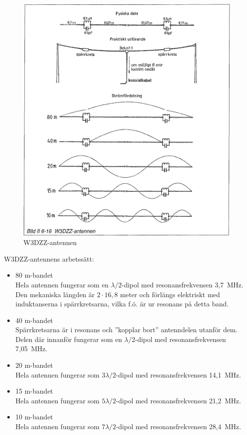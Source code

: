 \begin{figure}
  \includegraphics[width=\textwidth]{images/bild_2_6-16}
  \caption{W3DZZ-antennen}
  \label{fig:bildII6-16}
\end{figure}

W3DZZ-antennens arbetssätt:
\begin{itemize}
  \item 80 m-bandet \\ Hela antennen fungerar som en
    \(\lambda/2\)-dipol med resonansfrekvensen 3,7~MHz.  Den mekaniska
    längden är \(2 \cdot 16,8\) meter och förlängs elektriskt med
    induktanserna i spärrkretsarna, vilka f.ö. är ur resonans på detta
    band.
  \item 40 m-bandet \\ Spärrkretsarna är i resonans och ''kopplar
    bort'' antenndelen utanför dem. Delen där innanför fungerar som en
    \(\lambda/2\)-dipol med resonansfrekvensen 7,05~MHz.

  \item 20 m-bandet \\ Hela antennen fungerar som \(3\lambda/2\)-dipol
    med resonansfrekvensen 14,1~MHz.

  \item 15 m-bandet \\ Hela antennen fungerar som \(5\lambda/2\)-dipol
    med resonansfrekvensen 21,2~MHz.

  \item 10 m-bandet \\ Hela antennen fungerar som \(7\lambda/2\)-dipol
    med resonansfrekvensen 28,4~MHz.
\end{itemize}

